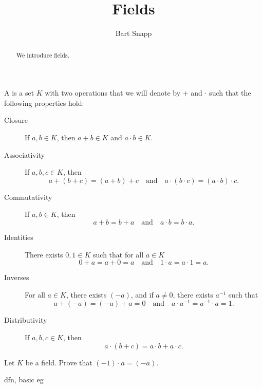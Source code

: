 \documentclass{ximera}
\author{Bart Snapp}
\title{Fields}
\begin{document}
\begin{abstract}
  We introduce fields.
\end{abstract}
\maketitle

\begin{definition}
  A  is a set $K$ with two operations that we will denote
  by $+$ and $\cdot$ such that the following properties hold:
  \begin{description}
  \item[Closure] If $a,b\in K$, then $a+b\in K$ and $a\cdot b\in K$.
  \item[Associativity] If $a,b,c\in K$, then
    \[
    a+(b+ c)  = (a+ b)+c\quad\text{and}\quad a\cdot(b\cdot c)  = (a\cdot b)\cdot c.
    \]
  \item[Commutativity] If $a,b\in K$, then
    \[
    a+b = b+a\quad\text{and}\quad a\cdot b = b\cdot a.
    \]
  \item[Identities] There exists $0,1\in K$ such that for all $a\in K$
    \[
    0+a = a + 0 = a \quad\text{and}\quad 1\cdot a = a\cdot 1 = a.
    \]
  \item[Inverses] For all $a\in K$, there exists $(-a)$, and if $a\ne
    0$, there exists $a^{-1}$ such that
    \[
    a+(-a) = (-a)+ a = 0\quad\text{and}\quad a\cdot a^{-1} = a^{-1}\cdot a  = 1.
    \]
  \item[Distributivity] If $a,b,c\in K$, then 
    \[
    a\cdot (b+c) = a\cdot b+ a\cdot c.
    \]
  \end{description}
\end{definition}


\begin{exercise}
  Let $K$ be a field. Prove that $(-1)\cdot a = (-a)$.
\end{exercise}



dfn, basic eg
\end{document}
